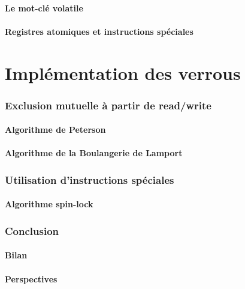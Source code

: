 \documentclass[9pt, handout]{beamer}
\begin{document}
\subsection{Le mot-clé volatile}


 
\subsection{Registres atomiques et instructions spéciales}





 
\part{Implémentation des verrous}
 
 
\section{Exclusion mutuelle à partir de read/write}
 
\subsection{Algorithme de Peterson}





 
\subsection{Algorithme de la Boulangerie de Lamport}



\section{Utilisation d'instructions spéciales}
 
\subsection{Algorithme spin-lock}
  


\section{Conclusion}
 
\subsection{Bilan}

 
\subsection{Perspectives}


\end{document}
